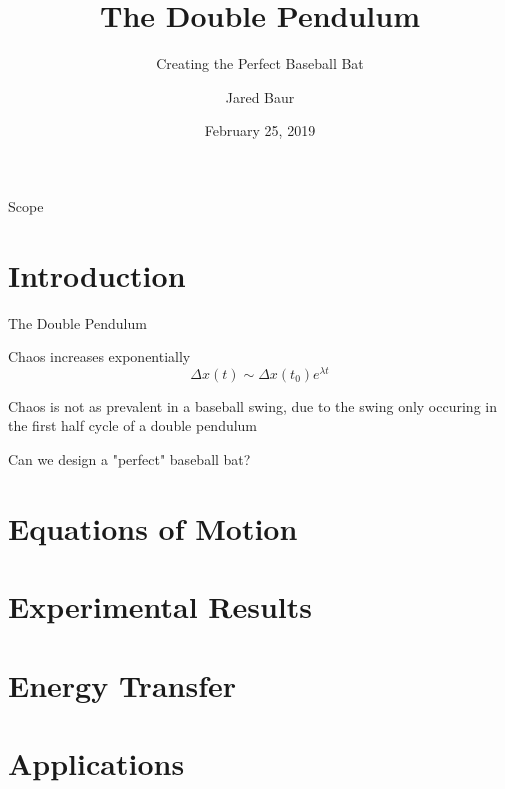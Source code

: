 \documentclass[tikz]{beamer}
\title{The Double Pendulum}
\subtitle{Creating the Perfect Baseball Bat}
\author{Jared Baur}
\institute[Occidental College] %
{
  Physics Department\\
  Occidental College
}
\date{February 25, 2019}
\begin{document}
\begin{frame}
  \titlepage
\end{frame}

\begin{frame}{Scope}
  \tableofcontents
\end{frame}


\section{Introduction}

\begin{frame}{The Double Pendulum}
	\only<1> {	
    		\begin{figure}
		    \centering
		\end{figure}
	}
	 {
    		\begin{figure}
		    \centering
		\end{figure}

		Chaos increases exponentially
		\begin{equation}
			\Delta x(t) \sim \Delta x(t_0) e^{\lambda t}
		\end{equation}
	}
	 {
		Chaos is not as prevalent in a baseball swing, due to the swing only occuring in the first half cycle of a double pendulum
    		\begin{figure}
		    \centering
		\end{figure}
		Can we design a "perfect" baseball bat?
	}
\end{frame}

\section{Equations of Motion}
	 {

	}


\section{Experimental Results}

\section{Energy Transfer}

\section{Applications}

\end{document}
